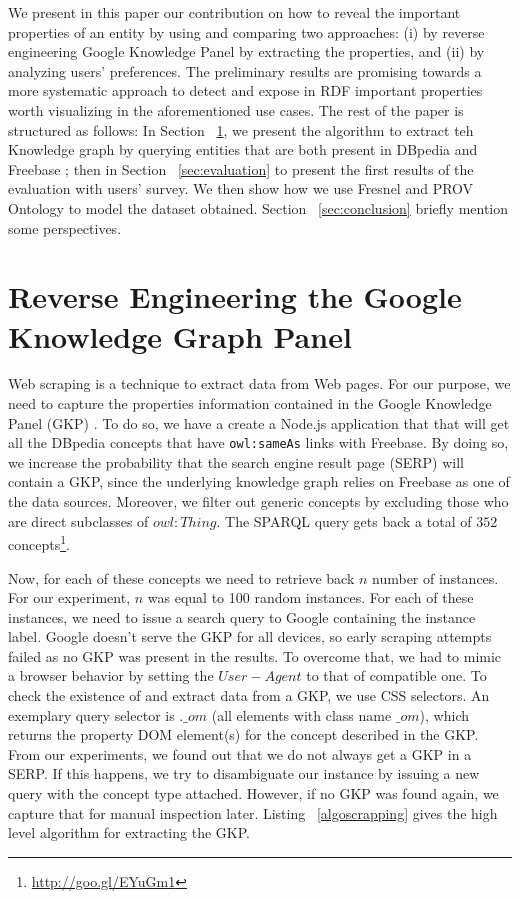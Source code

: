 \documentclass[runningheads,a4paper]{llncs}
\begin{document}
  We present in this paper our contribution on how to reveal the important properties of an entity by using and comparing two approaches: (i) by reverse engineering Google Knowledge Panel by extracting the properties, and (ii) by analyzing users' preferences. The preliminary results are promising towards a more systematic approach to detect and expose in RDF important properties worth visualizing in the aforementioned use cases. 
  The rest of the paper is structured as follows: In Section ~\ref{sec:knowledge-graph}, we present the algorithm to extract teh Knowledge graph by querying entities that are both present in DBpedia and Freebase ; then in Section ~\ref{sec:evaluation} to present the first results of the evaluation with users' survey. We then show how we use Fresnel and PROV Ontology to model the dataset obtained. Section ~\ref{sec:conclusion} briefly mention some perspectives.

\section{Reverse Engineering the Google Knowledge Graph Panel}
\label{sec:knowledge-graph}

Web scraping is a technique to extract data from Web pages. For our purpose, we need to capture the properties information contained in the Google Knowledge Panel (GKP) \cite{Bergman2012}. To do so, we have a create a Node.js application that that will get all the DBpedia concepts that have \texttt{owl:sameAs} links with Freebase. By doing so, we increase the probability that the search engine result page (SERP) will contain a GKP, since the underlying knowledge graph relies on Freebase as one of the data sources. Moreover, we filter out generic concepts by excluding those who are direct subclasses of $owl:Thing$. The SPARQL query gets back a total of $352$ concepts\footnote{\url{http://goo.gl/EYuGm1}}.

Now, for each of these concepts we need to retrieve back $n$ number of instances. For our experiment, $n$ was equal to 100 random instances. For each of these instances, we need to issue a search query to Google containing the instance label. Google doesn't serve the GKP for all devices, so early scraping attempts failed as no GKP was present in the results. To overcome that, we had to mimic a browser behavior by setting the $User-Agent$ to that of compatible one.
To check the existence of and extract data from a GKP, we use CSS selectors. An exemplary query selector is $.\_om$ (all elements with class name $\_om$), which returns the property DOM element(s) for the concept described in the GKP. From our experiments, we found out that we do not always get a GKP in a SERP. If this happens, we try to disambiguate our instance by issuing a new query with the concept type attached. However, if no GKP was found again, we capture that for manual inspection later. Listing ~\ref{algoscrapping} gives the high level algorithm for extracting the GKP.
\end{document}
